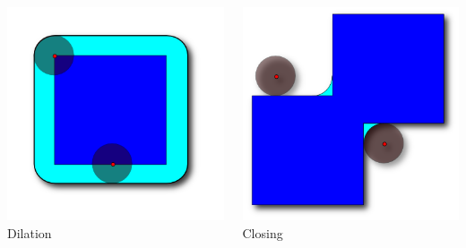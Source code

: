 \begin{frame}[fragile]
\begin{columns}[c]
\begin{center}
\includegraphics[width=1\textwidth]{Images/Dilation_shadow} \\
Dilation
\end{center}

\begin{center}
\includegraphics[width=1\textwidth]{Images/Closing_shadow} \\
Closing
\end{center}


\end{columns}
\end{frame}
